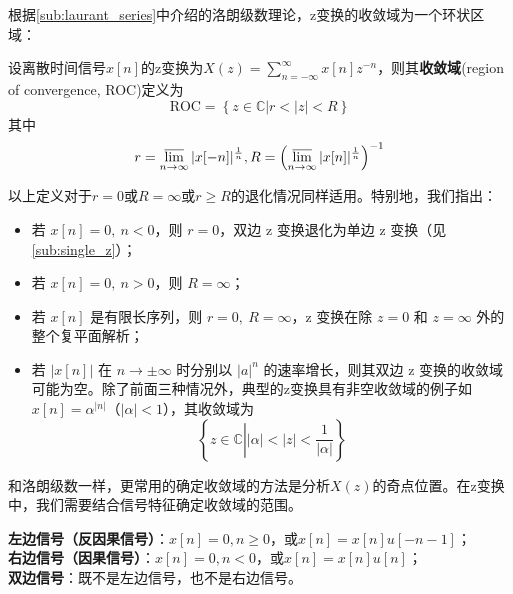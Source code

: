 根据\ref{sub:laurant_series}中介绍的洛朗级数理论，z变换的收敛域为一个环状区域：
\begin{definition}[z变换的收敛域]
    设离散时间信号$x[n]$的z变换为$X(z)=\sum_{n=-\infty}^{\infty}x[n]z^{-n}$，则其\textbf{收敛域}(region of convergence, ROC)定义为
    \[\text{ROC}=\left\{z\in\mathbb{C} \left|r<|z|<R\right.\right\}\]
    其中
    \[r=\varlimsup_{n\to\infty}|x[-n]|^{\frac{1}{n}},R=\left(\varlimsup_{n\to\infty}|x[n]|^{\frac{1}{n}}\right)^{-1}\]
\end{definition}
以上定义对于$r=0$或$R=\infty$或$r\geq R$的退化情况同样适用。特别地，我们指出：
\begin{itemize}
    \item 若 \( x[n] = 0,\ n < 0 \)，则 \( r = 0 \)，双边 z 变换退化为单边 z 变换（见\ref{sub:single_z}）；
    \item 若 \( x[n] = 0,\ n > 0 \)，则 \( R = \infty \)；
    \item 若 \( x[n] \) 是有限长序列，则 \( r = 0,\ R = \infty \)，z 变换在除 \( z = 0 \) 和 \( z = \infty \) 外的整个复平面解析；
    \item 若 \( |x[n]| \) 在 \( n \to \pm \infty \) 时分别以 \( |a|^n \) 的速率增长，则其双边 z 变换的收敛域可能为空。除了前面三种情况外，典型的z变换具有非空收敛域的例子如 \( x[n] = \alpha^{|n|} \)（\( |\alpha| < 1 \)），其收敛域为
     \[\left\{z\in\mathbb{C}\left| |\alpha| < |z| < \dfrac{1}{|\alpha|}\right. \right\}\]
\end{itemize}

和洛朗级数一样，更常用的确定收敛域的方法是分析$X(z)$的奇点位置。在z变换中，我们需要结合信号特征确定收敛域的范围。
\begin{definition}
    \textbf{左边信号（反因果信号）}：$x[n]=0,n\geq 0$，或$x[n]=x[n]u[-n-1]$；\\
    \textbf{右边信号（因果信号）}：$x[n]=0,n<0$，或$x[n]=x[n]u[n]$；\\
    \textbf{双边信号}：既不是左边信号，也不是右边信号。
\end{definition}

